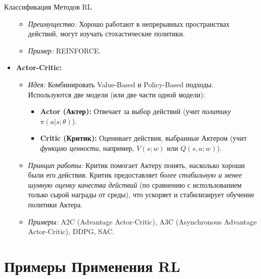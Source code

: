 \begin{myblock}{Классификация Методов RL}
\begin{itemize}
\begin{itemize}
                \item \textit{Преимущество:} Хорошо работают в непрерывных пространствах действий, могут изучать стохастические политики.
                \item \textit{Пример:} REINFORCE.
            \end{itemize}
        \item \textbf{Actor-Critic:}
            \begin{itemize}
                \item \textit{Идея:} Комбинировать Value-Based и Policy-Based подходы. Используются две модели (или две части одной модели):
                    \begin{itemize}
                        \item \textbf{Actor (Актер):} Отвечает за выбор действий (учит \textit{политику} $\pi(a|s; \theta)$).
                        \item \textbf{Critic (Критик):} Оценивает действия, выбранные Актером (учит \textit{функцию ценности}, например, $V(s; w)$ или $Q(s,a; w)$).
                    \end{itemize}
                \item \textit{Принцип работы:} Критик помогает Актеру понять, насколько хороши были его действия. Критик предоставляет \textit{более стабильную и менее шумную оценку качества действий} (по сравнению с использованием только сырой награды от среды), что ускоряет и стабилизирует обучение политики Актера.
                \item \textit{Примеры:} A2C (Advantage Actor-Critic), A3C (Asynchronous Advantage Actor-Critic), DDPG, SAC.
            \end{itemize}
    \end{itemize}
\end{myblock}

\section{Примеры Применения RL}

